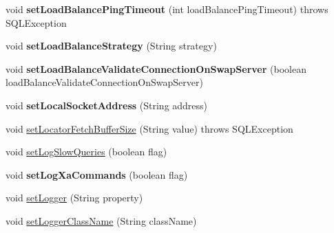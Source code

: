 \begin{DoxyCompactItemize}
\item 
\mbox{\label{classcom_1_1mysql_1_1jdbc_1_1_multi_host_my_s_q_l_connection_a7ea3db30bb4e0f7ff3eb74bc7d3fd293}} 
void {\bfseries set\+Load\+Balance\+Ping\+Timeout} (int load\+Balance\+Ping\+Timeout)  throws S\+Q\+L\+Exception 
\item 
\mbox{\label{classcom_1_1mysql_1_1jdbc_1_1_multi_host_my_s_q_l_connection_a301608a24e1d280826fbe779feb6dcef}} 
void {\bfseries set\+Load\+Balance\+Strategy} (String strategy)
\item 
\mbox{\label{classcom_1_1mysql_1_1jdbc_1_1_multi_host_my_s_q_l_connection_aeb50ecf053d5dfe9201b038fbfbf2485}} 
void {\bfseries set\+Load\+Balance\+Validate\+Connection\+On\+Swap\+Server} (boolean load\+Balance\+Validate\+Connection\+On\+Swap\+Server)
\item 
\mbox{\label{classcom_1_1mysql_1_1jdbc_1_1_multi_host_my_s_q_l_connection_a19fa939d121f6746f7d397b4b74222e1}} 
void {\bfseries set\+Local\+Socket\+Address} (String address)
\item 
void \mbox{\hyperlink{classcom_1_1mysql_1_1jdbc_1_1_multi_host_my_s_q_l_connection_a2c06dae5dc39a0e78d8f40f916376021}{set\+Locator\+Fetch\+Buffer\+Size}} (String value)  throws S\+Q\+L\+Exception 
\item 
void \mbox{\hyperlink{classcom_1_1mysql_1_1jdbc_1_1_multi_host_my_s_q_l_connection_a89d164c3f8f46d2f95ec2b1eae60e344}{set\+Log\+Slow\+Queries}} (boolean flag)
\item 
\mbox{\label{classcom_1_1mysql_1_1jdbc_1_1_multi_host_my_s_q_l_connection_a9611688166d29feb13ea2283420ac296}} 
void {\bfseries set\+Log\+Xa\+Commands} (boolean flag)
\item 
void \mbox{\hyperlink{classcom_1_1mysql_1_1jdbc_1_1_multi_host_my_s_q_l_connection_a8ff36862180722f5f43542808c8764f0}{set\+Logger}} (String property)
\item 
void \mbox{\hyperlink{classcom_1_1mysql_1_1jdbc_1_1_multi_host_my_s_q_l_connection_a2d01c838ac3a65f71743aaa28f220ed0}{set\+Logger\+Class\+Name}} (String class\+Name)

\end{DoxyCompactItemize}
